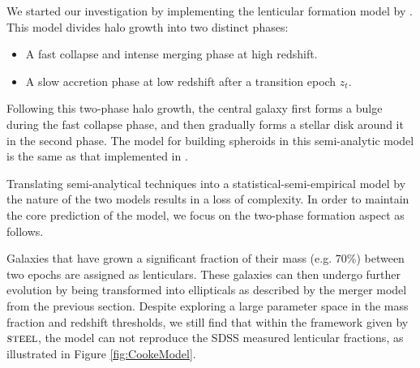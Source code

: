 We started our investigation by implementing the lenticular formation model by \citet{Cook2009Two-phaseFormation}. This model divides halo growth into two distinct phases: \begin{itemize}
    \item A fast collapse and intense merging phase at high redshift.
    \item A slow accretion phase at low redshift after a transition epoch $z_{t}$.
\end{itemize}
Following this two-phase halo growth, the central galaxy first forms a bulge during the fast collapse phase, and then gradually forms a stellar disk around it in the second phase. The model for building spheroids in this semi-analytic model is the same as that implemented in \citet{Granato2004AHosts}. 

Translating semi-analytical techniques into a statistical-semi-empirical model by the nature of the two models results in a loss of complexity. In order to maintain the core prediction of the \citet{Cook2009Two-phaseFormation} model, we focus on the two-phase formation aspect as follows. 

Galaxies that have grown a significant fraction of their mass (e.g. 70\%) between two epochs are assigned as lenticulars. These galaxies can then undergo further evolution by being transformed into ellipticals as described by the merger model from the previous section. Despite exploring a large parameter space in the mass fraction and redshift thresholds, we still find that within the framework given by $\textsc{steel}$, the \citet{Cook2009Two-phaseFormation} model can not reproduce the SDSS measured lenticular fractions, as illustrated in Figure \ref{fig:CookeModel}.

